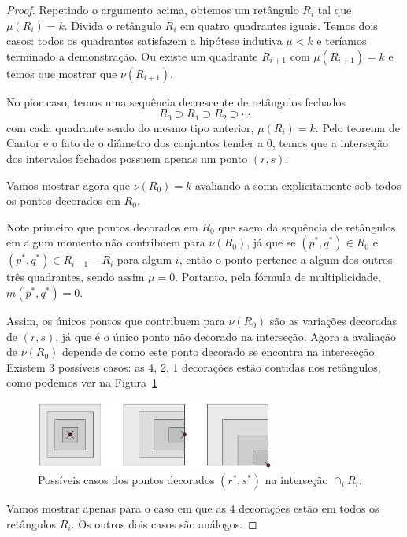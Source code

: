 \begin{proof}
Repetindo o argumento acima, obtemos um retângulo $R_i$ tal que $\mu(R_i) = k$. 
Divida o retângulo $R_i$ em quatro quadrantes iguais. Temos dois
casos: todos os quadrantes satisfazem a hipótese indutiva $\mu<k$ e teríamos terminado a demonstração.
Ou existe um quadrante $R_{i+1}$ com $\mu(R_{i+1})=k$ e temos que mostrar que $\nu(R_{i+1})$.

No pior caso, temos uma sequência decrescente de retângulos fechados
\begin{equation*}
    R_0 \supset R_1 \supset R_2 \supset \cdots
\end{equation*}
com cada quadrante sendo do mesmo tipo anterior, $\mu(R_i) = k$. Pelo teorema de Cantor e o fato
de o diâmetro dos conjuntos tender a $0$, temos que a interseção dos intervalos fechados possuem
apenas um ponto $(r,s)$.

Vamos mostrar agora que $\nu(R_0) = k$ avaliando a soma explicitamente sob todos os pontos decorados
em $R_0$.

Note primeiro que pontos decorados em $R_0$ que saem da sequência de retângulos em algum momento não
contribuem para $\nu(R_0)$, já que se $(p^*, q^*) \in R_0$ e $(p^*, q^*) \in R_{i-1} - R_i$ para 
algum $i$, então o ponto pertence a algum dos outros três quadrantes, sendo assim $\mu = 0$. 
Portanto, pela fórmula de multiplicidade, $m(p^*, q^*) = 0$. 

Assim, os únicos pontos que contribuem para $\nu(R_0)$ são as variações decoradas de $(r,s)$, já 
que é o único ponto não decorado na interseção. Agora a avaliação de $\nu(R_0)$ depende de como 
este ponto decorado se encontra na intereseção. Existem 3 possíveis casos: as 4, 2, 1 decorações
estão contidas nos retângulos, como podemos ver na Figura~\ref{fig:proof_rect}

\begin{figure}[htpb!]
    \centering
    \includegraphics[width=0.7\textwidth]{images/proof_rect.png}
    \caption{Possíveis casos dos pontos decorados $(r^*, s^*)$ na interseção $\cap_i R_i$.}
    \label{fig:proof_rect}
\end{figure}

Vamos mostrar apenas para o caso em que as 4 decorações estão em todos os retângulos $R_i$. Os outros
dois casos são análogos. 


\end{proof}
